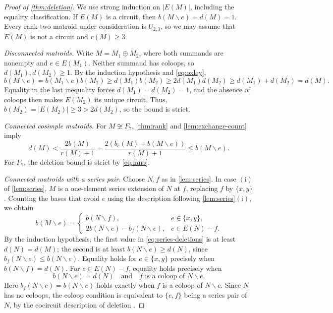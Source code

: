 \documentclass[10pt,a4paper]{article}
\numberwithin{equation}{section}
\begin{document}
\begin{proof}[Proof of \autoref{thm:deletion}]
We use strong induction on \(|E(M)|\), including the equality classification.
If \(E(M)\) is a circuit, then \(b(M\backslash e)=d(M)=1\).
Every rank-two matroid under consideration is \(U_{2,3}\),
so we may assume that \(E(M)\) is not a circuit and \(r(M)\ge3\).

\emph{Disconnected matroids.}
Write \(M=M_1\oplus M_2\), where both summands are nonempty
and \(e\in E(M_1)\).
Neither summand has coloops, so \(d(M_1),d(M_2)\ge1\).
By the induction hypothesis and \eqref{eq:oxley},
\[
 b(M\backslash e)=b(M_1\backslash e)b(M_2)\ge d(M_1)b(M_2)\ge2d(M_1)d(M_2)\ge d(M_1)+d(M_2)=d(M).
\]
Equality in the last inequality forces \(d(M_1)=d(M_2)=1\),
and the absence of coloops then makes \(E(M_2)\) its unique circuit.
Thus, \(b(M_2)=|E(M_2)|\ge3>2d(M_2)\), so the bound is strict.

\emph{Connected cosimple matroids.}
For \(M\not\cong F_7\), \autoref{thm:rank} and
\autoref{lem:exchange-count} imply
\[
 d(M)<\frac{2b(M)}{r(M)+1}
 =\frac{2(b_e(M)+b(M\backslash e))}{r(M)+1}
 \le b(M\backslash e).
\]
For \(F_7\), the deletion bound is strict by \eqref{eq:fano}.

\emph{Connected matroids with a series pair.}
Choose \(N,f\) as in \autoref{lem:series}.
In case \(\mathrm{(i)}\) of \autoref{lem:series}, \(M\) is a
one-element series extension of \(N\) at \(f\), replacing
\(f\) by \(\{x,y\}\).
Counting the bases that avoid \(e\) using the description following
\autoref{lem:series}\(\mathrm{(i)}\), we obtain
\begin{equation}\label{eq:series-deletions}
 b(M\backslash e)=
 \begin{cases}
 b(N\backslash f),&e\in\{x,y\},\\
 2b(N\backslash e)-b_f(N\backslash e),&e\in E(N)-f.
 \end{cases}
\end{equation}
By the induction hypothesis, the first value in
\eqref{eq:series-deletions} is at least \(d(N)=d(M)\);
the second is at least \(b(N\backslash e)\ge d(N)\), since
\(b_f(N\backslash e)\le b(N\backslash e)\).
Equality holds for \(e\in\{x,y\}\) precisely when
\(b(N\backslash f)=d(N)\). For \(e\in E(N)-f\), equality holds precisely when
\[
 b(N\backslash e)=d(N)
 \quad\text{and}\quad f\text{ is a coloop of }N\backslash e.
\]
Here \(b_f(N\backslash e)=b(N\backslash e)\) holds exactly when
\(f\) is a coloop of \(N\backslash e\).
Since \(N\) has no coloops, the coloop condition is equivalent
to \(\{e,f\}\) being a series pair of \(N\), by the cocircuit
description of deletion \cite[(3.1.16)]{Oxley2011}.


\end{proof}
\end{document}
